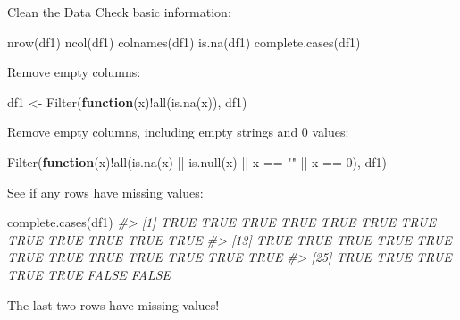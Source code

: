 \documentclass[
  11pt,
  ignorenonframetext,
  svgnames, handout, t]{beamer}
\newenvironment{Shaded}{\begin{snugshade}}{\end{snugshade}}
\newcommand{\CommentTok}[1]{\textcolor[rgb]{0.56,0.35,0.01}{\textit{#1}}}
\newcommand{\ControlFlowTok}[1]{\textcolor[rgb]{0.13,0.29,0.53}{\textbf{#1}}}
\newcommand{\DecValTok}[1]{\textcolor[rgb]{0.00,0.00,0.81}{#1}}
\newcommand{\FunctionTok}[1]{\textcolor[rgb]{0.00,0.00,0.00}{#1}}
\newcommand{\NormalTok}[1]{#1}
\newcommand{\OtherTok}[1]{\textcolor[rgb]{0.56,0.35,0.01}{#1}}
\newcommand{\SpecialCharTok}[1]{\textcolor[rgb]{0.00,0.00,0.00}{#1}}
\newcommand{\StringTok}[1]{\textcolor[rgb]{0.31,0.60,0.02}{#1}}
\begin{document}
\begin{frame}[fragile]{Clean the Data}
\protect\hypertarget{clean-the-data}{}
Check basic information:

\footnotesize

\begin{Shaded}
\begin{Highlighting}[]
\FunctionTok{nrow}\NormalTok{(df1)}
\FunctionTok{ncol}\NormalTok{(df1)}
\FunctionTok{colnames}\NormalTok{(df1)}
\FunctionTok{is.na}\NormalTok{(df1)}
\FunctionTok{complete.cases}\NormalTok{(df1)}
\end{Highlighting}
\end{Shaded}

\normalsize

Remove empty columns:

\footnotesize

\begin{Shaded}
\begin{Highlighting}[]
\NormalTok{df1 }\OtherTok{\textless{}{-}} \FunctionTok{Filter}\NormalTok{(}\ControlFlowTok{function}\NormalTok{(x)}\SpecialCharTok{!}\FunctionTok{all}\NormalTok{(}\FunctionTok{is.na}\NormalTok{(x)), df1)}
\end{Highlighting}
\end{Shaded}

\normalsize

Remove empty columns, including empty strings and 0 values:

\footnotesize

\begin{Shaded}
\begin{Highlighting}[]
\FunctionTok{Filter}\NormalTok{(}\ControlFlowTok{function}\NormalTok{(x)}\SpecialCharTok{!}\FunctionTok{all}\NormalTok{(}\FunctionTok{is.na}\NormalTok{(x) }\SpecialCharTok{||} \FunctionTok{is.null}\NormalTok{(x) }\SpecialCharTok{||}\NormalTok{ x }\SpecialCharTok{==} \StringTok{""} \SpecialCharTok{||}\NormalTok{ x }\SpecialCharTok{==} \DecValTok{0}\NormalTok{), df1)}
\end{Highlighting}
\end{Shaded}

\normalsize

See if any rows have missing values:

\footnotesize

\begin{Shaded}
\begin{Highlighting}[]
\FunctionTok{complete.cases}\NormalTok{(df1)}
\CommentTok{\#\textgreater{}  [1]  TRUE  TRUE  TRUE  TRUE  TRUE  TRUE  TRUE  TRUE  TRUE  TRUE  TRUE  TRUE}
\CommentTok{\#\textgreater{} [13]  TRUE  TRUE  TRUE  TRUE  TRUE  TRUE  TRUE  TRUE  TRUE  TRUE  TRUE  TRUE}
\CommentTok{\#\textgreater{} [25]  TRUE  TRUE  TRUE  TRUE  TRUE FALSE FALSE}
\end{Highlighting}
\end{Shaded}

\normalsize The last two rows have missing values!
\end{frame}
\end{document}
